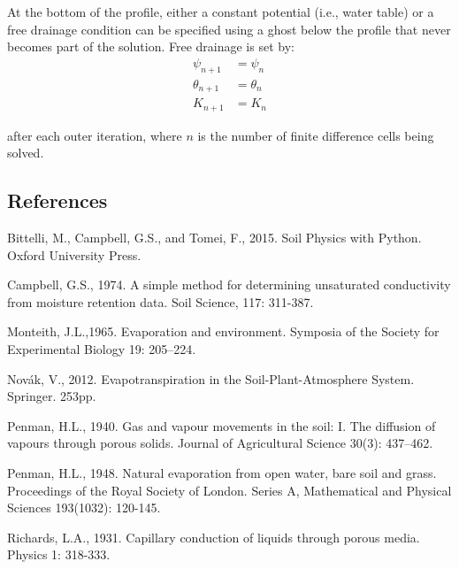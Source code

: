 \documentclass[10pt, letterpapr]{article}
\begin{document}
At the bottom of the profile, either a constant potential (i.e., water table) or a free drainage condition can be specified using a ghost below the profile that never becomes part of the solution. Free drainage is set by:
\begin{align*}
	\psi_{n+1} &=\psi_n \\
	\theta_{n+1} &=\theta_n \\
	K_{n+1} &=K_n
\end{align*}

\noindent after each outer iteration, where $n$ is the number of finite difference cells being solved.

\newpage
\subsection*{References}

Bittelli, M., Campbell, G.S., and Tomei, F., 2015. Soil Physics with Python. Oxford University Press.

Campbell, G.S., 1974. A simple method for determining unsaturated conductivity from moisture retention data. Soil Science, 117: 311-387.

Monteith, J.L.,1965. Evaporation and environment. Symposia of the Society for Experimental Biology 19: 205–224.

Nov\'ak, V., 2012. Evapotranspiration in the Soil-Plant-Atmosphere System. Springer. 253pp.

Penman, H.L., 1940. Gas and vapour movements in the soil: I. The diffusion of vapours through porous solids. Journal of Agricultural Science 30(3): 437--462.

Penman, H.L., 1948. Natural evaporation from open water, bare soil and grass. Proceedings of the Royal Society of London. Series A, Mathematical and Physical Sciences 193(1032): 120-145.

Richards, L.A., 1931. Capillary conduction of liquids through porous media. Physics 1: 318-333.
\end{document}
